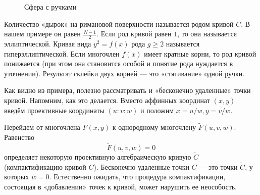 \documentclass{article}
\theoremstyle{definition}
\theoremstyle{definition} %
\theoremstyle{remark}     %
\theoremstyle{definition}
\theoremstyle{definition}
\theoremstyle{definition}
\theoremstyle{definition}
\theoremstyle{definition}
\theoremstyle{definition}
\theoremstyle{definition}
\theoremstyle{definition}
\begin{document}
\begin{figure}[!ht]
\centering
\begin{subfigure}{0.45\textwidth}
\centering
{}
\end{subfigure}
\hfill
\raisebox{1.5cm}{\scalebox{2.5}{$\approx$}}
\hfill
\begin{subfigure}{0.45\textwidth}
\centering
{}
\end{subfigure}

\caption{Сфера с ручками}
\end{figure}


Количество «дырок» на римановой поверхности называется родом кривой \(C\). В нашем примере он равен \(\frac{N-1}{2}\). Если род кривой равен \(1\), то она называется эллиптической. Кривая вида \(y^2 = f(x)\) рода \(g \ge 2\) называется гиперэллиптической. Если многочлен \(f(x)\) имеет кратные корни, то род кривой понижается (при этом она становится особой и понятие рода нуждается в уточнении). Результат склейки двух корней — это «стягивание» одной ручки.

Как видно из примера, полезно рассматривать и «бесконечно удаленные» точки кривой. Напомним, как это делается. Вместо аффинных координат $(x, y)$ введём проективные координаты $(u:v:w)$ и положим $x=u/w, y=v/w$.

Перейдем от многочлена \( F(x, y) \) к однородному многочлену \( \tilde{F}(u, v, w) \). Равенство
\[
\tilde{F}(u, v, w) = 0
\]
определяет некоторую проективную алгебраическую кривую \( \tilde{C} \) (компактификацию кривой \( C \)). Бесконечно удаленные точки \( C \) — это точки \( \tilde{C} \), у которых \( w = 0 \). Естественно ожидать, что процедура компактификации, состоящая в «добавлении» точек к кривой, может нарушить ее неособость.
\end{document}
